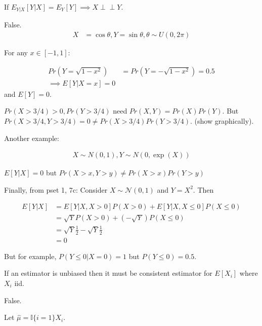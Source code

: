 \documentclass{exam}
\newcommand{\indep}{\perp \!\!\! \perp}
\begin{document}
\begin{questions}
    \question If $E_{Y | X}[Y | X ] = E_Y[Y] \implies X \indep Y$.

    \begin{solution}
        
    False. 
    \begin{align*}
        X &= \cos \theta, Y = \sin \theta, \theta \sim U(0, 2\pi)
    \end{align*}

    For any $x \in [-1, 1]$:

    \begin{align*}
        Pr(Y = \sqrt{1 - x^2}) &= Pr(Y = - \sqrt{1 - x^2}) = 0.5 \\
        \implies E[Y | X = x] = 0
    \end{align*}
    and $E[Y] = 0$.

    $Pr(X > 3/4) > 0, Pr(Y > 3/4)$ need $Pr(X, Y) = Pr(X)Pr(Y)$.
    But $Pr(X > 3/4, Y > 3/4) = 0 \neq Pr(X > 3/4)Pr(Y > 3/4)$. (show graphically).


    Another example:

    \begin{align*}
        X \sim  N(0, 1), Y \sim N(0, \exp(X))
    \end{align*}

    $E[Y | X] = 0$ but $Pr(X > x, Y > y) \neq Pr(X > x) Pr(Y > y)$


    Finally, from pset 1, 7c:
    Consider $X\sim\mathcal{N}(0, 1)$ and $Y = X^2$. Then

        \begin{align*}
            E[Y\vert X] & = E[Y\vert X, X > 0] P(X > 0) + E[Y\vert X, X \leq 0] P(X \leq 0) \\
            & =  \sqrt{Y} P(X > 0) +\left(-\sqrt{Y}\right) P(X \leq 0) \\
            & =  \sqrt{Y} \frac{1}{2} -\sqrt{Y} \frac{1}{2} \\
            &=0
        \end{align*}

        But for example, $P(Y\leq 0\vert X = 0) = 1$ but $P(Y\leq 0) = 0.5$. 
    \end{solution}


    \question If an estimator is unbiased then it must be consistent estimator for 
    $E[X_i]$ where $X_i$ iid.

    \begin{solution}
        False.

        Let $\hat{\mu} = \mathbb{I}\{i = 1\}X_i$.


\end{solution}
\end{questions}
\end{document}
